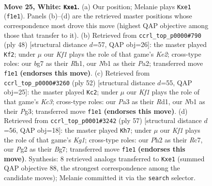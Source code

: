 \documentclass[11pt]{article}
\begin{document}
\clearpage

\begin{figure}[p]\centering
\begin{subfigure}{0.46\textwidth}\centering
\resizebox{\linewidth}{!}{%
\newchessgame
\chessboard[
  setfen={rn6/5kb1/2p5/4p1B1/p6p/P7/RPP2PPP/1N2rK2 w - - 0 25},
  showmover=false,
  pgfstyle=straightmove, color=movearrow, markmove={f1-e1}
]}
\caption{}
\end{subfigure}\hfill
\begin{subfigure}{0.46\textwidth}\centering
\resizebox{\linewidth}{!}{%
\newchessgame
\chessboard[
  setfen={3r2k1/5pp1/p2r4/Bb2p2p/4P3/5PP1/PPR1K2P/7R w - - 5 25},
  showmover=false,
  pgfstyle=straightmove, color=movearrow, markmove={e2-f2}
]}
\caption{}
\end{subfigure}
\\[4pt]
\begin{subfigure}{0.46\textwidth}\centering
\resizebox{\linewidth}{!}{%
\newchessgame
\chessboard[
  setfen={r4k2/1p3pn1/1N2p3/p1p5/2P1R3/P1K2rP1/1P6/3R4 w - - 4 27},
  showmover=false,
  pgfstyle=straightmove, color=movearrow, markmove={c3-c2}
]}
\caption{}
\end{subfigure}\hfill
\begin{subfigure}{0.46\textwidth}\centering
\resizebox{\linewidth}{!}{%
\newchessgame
\chessboard[
  setfen={1R4k1/2r2pb1/6pp/p2r4/4p2P/2P1B1P1/P4P2/4R1K1 b - - 1 29},
  showmover=false,
  pgfstyle=straightmove, color=movearrow, markmove={g8-h7}
]}
\caption{}
\end{subfigure}
\caption{\textbf{Move 25, White: \texttt{Kxe1}.} (a) Our position; Melanie plays \texttt{Kxe1} (\texttt{f1e1}). Panels (b)--(d) are the retrieved master positions whose correspondence most drove this move (highest QAP objective among those that transfer to it). (b) Retrieved from \texttt{ccrl\_top\_p0000\#790} (ply 48) [structural distance $d$=57, QAP obj=26]: the master played \texttt{Kf2}; under $\mu$ our \emph{Kf1} plays the role of that game's \emph{Ke2}; cross-type roles: our \emph{b}g7 as their \emph{R}h1, our \emph{N}b1 as their \emph{P}a2; transferred move \texttt{f1e1} \textbf{(endorses this move)}. (c) Retrieved from \texttt{ccrl\_top\_p0000\#3260} (ply 52) [structural distance $d$=55, QAP obj=25]: the master played \texttt{Kc2}; under $\mu$ our \emph{Kf1} plays the role of that game's \emph{Kc3}; cross-type roles: our \emph{P}a3 as their \emph{R}d1, our \emph{N}b1 as their \emph{P}g3; transferred move \texttt{f1e1} \textbf{(endorses this move)}. (d) Retrieved from \texttt{ccrl\_top\_p0001\#3242} (ply 57) [structural distance $d$=56, QAP obj=18]: the master played \texttt{Kh7}; under $\mu$ our \emph{Kf1} plays the role of that game's \emph{Kg1}; cross-type roles: our \emph{P}h2 as their \emph{R}c7, our \emph{P}g2 as their \emph{B}g7; transferred move \texttt{f1e1} \textbf{(endorses this move)}. Synthesis: 8 retrieved analogs transferred to \texttt{Kxe1} (summed QAP objective 88, the strongest correspondence among the candidate moves); Melanie committed it via the \texttt{search} selector.}
\label{fig:thought-m48}
\end{figure}
\end{document}
